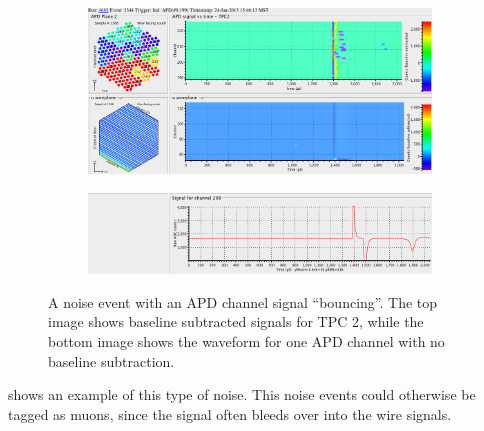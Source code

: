 \documentclass[herrin-thesis.tex]{subfiles}
\begin{document}
\begin{figure}[tbp]
\centering
\begin{subfigure}[b]{1.0\textwidth}
\centering
\includegraphics[width=\textwidth]{./plots/noise_eventdisplay_run_4685_ev_3344.png}
\end{subfigure}
\begin{subfigure}[b]{1.0\textwidth}
\centering
\includegraphics[width=\textwidth]{./plots/noise_eventdisplay_run_4685_ev_3344_waveform.png}
\end{subfigure}
\caption[APD ``bouncing'' noise]{A noise event with an APD channel signal ``bouncing''. The top image shows baseline subtracted signals for TPC 2, while the bottom image shows the waveform for one APD channel with no baseline subtraction.}
\label{fig:noise_apd_bounce}
\end{figure}

 shows an example of this type of noise. This noise events could otherwise be tagged as muons, since the signal often bleeds over into the wire signals.
\end{document}

